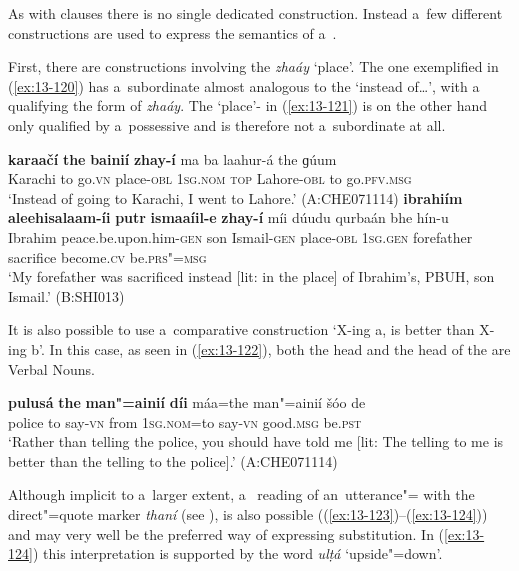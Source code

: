  As with  clauses there is no single dedicated  construction. Instead a~few different constructions are used to express the semantics of a~.


First, there are constructions involving the  \textit{zhaáy} `place'. The one exemplified in (\ref{ex:13-120}) has a~subordinate  almost analogous to the \iliEnglish `instead of{\ldots}', with a~ qualifying the  form of \textit{zhaáy}. The `place'- in (\ref{ex:13-121}) is on the other hand only qualified by a~possessive  and is therefore not a~subordinate  at all. 

\ea
\label{ex:13-120}
\gll \textbf{karaačí} \textbf{the} \textbf{bainií} \textbf{zhay-í} ma ba laahur-á  the ɡúum \\
Karachi to go.\textsc{vn} place-\textsc{obl} \textsc{1sg.nom} \textsc{top} Lahore-\textsc{obl} to go.\textsc{pfv.msg} \\
\glt `Instead of going to Karachi, I went to Lahore.' (A:CHE071114)
\ex
\label{ex:13-121}
\gll \textbf{ibrahiím} \textbf{aleehisalaam-íi} \textbf{putr} \textbf{ismaaíil-e} \textbf{zhay-í} míi dúudu qurbaán bhe hín-u\\
Ibrahim peace.be.upon.him-\textsc{gen} son Ismail-\textsc{gen} place-\textsc{obl}  \textsc{1sg.gen} forefather sacrifice become.\textsc{cv} be.\textsc{prs"=msg} \\
\glt `My forefather was sacrificed instead [lit: in the place] of Ibrahim's, PBUH, son Ismail.' (B:SHI013) 
\z

It is also possible to use a~comparative construction `X-ing a, is better than X-ing b'. In this case, as seen in (\ref{ex:13-122}), both the  head and the head of the    are Verbal Nouns.

\begin{exe}
\ex
\label{ex:13-122}
\gll \textbf{pulusá} \textbf{the} \textbf{man"=ainií} \textbf{díi} máa=the man"=ainií šóo de \\
police to say-\textsc{vn} from \textsc{1sg.nom=}to say-\textsc{vn} good.\textsc{msg} be.\textsc{pst} \\
\glt `Rather than telling the police, you should have told me [lit: The telling to me is better than the telling to the police].' (A:CHE071114) 
\end{exe}

Although implicit to a~larger extent, a~ reading of an~utterance"= with the direct"=quote marker \textit{thaní} (see ), is also possible ((\ref{ex:13-123})--(\ref{ex:13-124})) and may very well be the preferred way of expressing substitution. In (\ref{ex:13-124}) this interpretation is supported by the word \textit{ulṭá} `upside"=down'.


